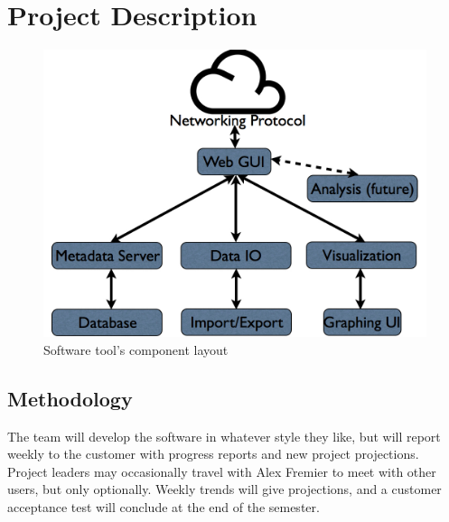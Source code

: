
\section{Project Description}

\begin{figure}[!h]
        \begin{center}
		\includegraphics[width=120mm]{images/tool_layout}
                \caption{Software tool's component layout}
                \label{tool_layout}
        \end{center}
\end{figure}


\subsection{Methodology}
The team will develop the software in whatever style they like, but will report
weekly to the customer with progress reports and new project projections. 
Project leaders may occasionally travel with Alex Fremier to meet with other
users, but only optionally. Weekly trends will give projections, and a 
customer acceptance test will conclude at the end of the semester.


